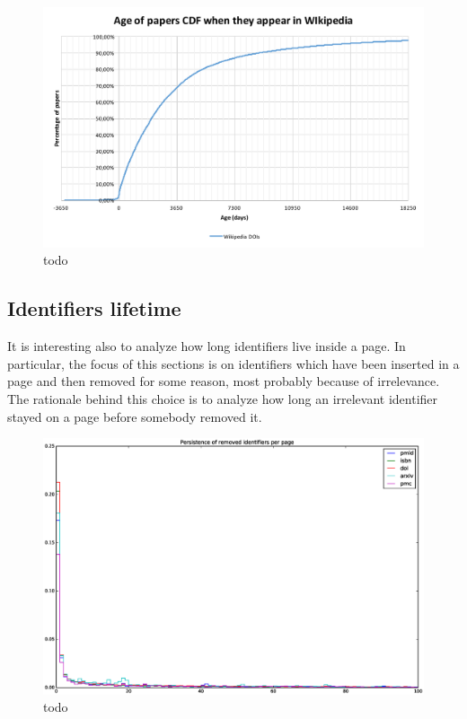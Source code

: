 \begin{figure}[h]
\centering
\includegraphics[keepaspectratio=true, width=\textwidth]{assets/age_of_papers_at_first_appearance_cdf}
\caption{todo}
\label{fig:age_of_papers_at_first_appearance_cdf}
\end{figure}

\subsection{Identifiers lifetime}
It is interesting also to analyze how long identifiers live inside a page.
In particular, the focus of this sections is on identifiers which have been inserted in a page and then removed for some reason, most probably because of irrelevance.
The rationale behind this choice is to analyze how long an irrelevant identifier stayed on a page before somebody removed it.

\begin{figure}[h]
\centering
\includegraphics[keepaspectratio=true, width=\textwidth]{assets/persistence_removed_identifiers_pdf}
\caption{todo}
\label{fig:persistence_removed_identifiers_pdf}
\end{figure}

